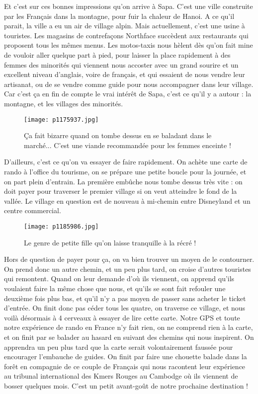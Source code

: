 \documentclass{book}
\begin{document}
Et c'est sur ces bonnes impressions qu'on arrive à Sapa. C'est une ville construite par les Français dans la montagne, pour fuir la chaleur de Hanoi. A ce qu'il parait, la ville a eu un air de village alpin. Mais actuellement, c'est une usine à touristes. Les magasins de contrefaçons Northface succèdent aux restaurants qui proposent tous les mêmes menus. Les motos-taxis nous hèlent dès qu'on fait mine de vouloir aller quelque part à pied, pour laisser la place rapidement à des femmes des minorités qui viennent nous accoster avec un grand sourire et un excellent niveau d'anglais, voire de français, et qui essaient de nous vendre leur artisanat, ou de se vendre comme guide pour nous accompagner dans leur village. Car c'est ça en fin de compte le vrai intérêt de Sapa, c'est ce qu'il y a autour : la montagne, et les villages des minorités.


\begin{figure}[h]
\centering
\texttt{[image: p1175937.jpg]}
\caption*{Ça fait bizarre quand on tombe dessus en se baladant dans le marché... C'est une viande recommandée pour les femmes enceinte !}
\end{figure}

D'ailleurs, c'est ce qu'on va essayer de faire rapidement. On achète une carte de rando à l'office du tourisme, on se prépare une petite boucle pour la journée, et on part plein d'entrain. La première embûche nous tombe dessus très vite : on doit payer pour traverser le premier village si on veut atteindre le fond de la vallée. Le village en question est de nouveau à mi-chemin entre Disneyland et un centre commercial.


\begin{wrapfigure}{l}{0.55\textwidth}
\centering
\texttt{[image: p1185986.jpg]}
\caption*{Le genre de petite fille qu'on laisse tranquille à la récré !}
\end{wrapfigure}

Hors de question de payer pour ça, on va bien trouver un moyen de le contourner. On prend donc un autre chemin, et un peu plus tard, on croise d'autres touristes qui remontent. Quand on leur demande d'où ils viennent, on apprend qu'ils voulaient faire la même chose que nous, et qu'ils se sont fait refouler une deuxième fois plus bas, et qu'il n'y a pas moyen de passer sans acheter le ticket d'entrée. On finit donc pas céder tous les quatre, on traverse ce village, et nous voilà désormais à 4 cerveaux à essayer de lire cette carte. Notre GPS et toute notre expérience de rando en France n'y fait rien, on ne comprend rien à la carte, et on finit par se balader au hasard en suivant des chemins qui nous inspirent. On apprendra un peu plus tard que la carte serait volontairement faussée pour encourager l'embauche de guides. On finit par faire une chouette balade dans la forêt en compagnie de ce couple de Français qui nous racontent leur expérience au tribunal international des Kmers Rouges au Cambodge où ils viennent de bosser quelques mois. C'est un petit avant-goût de notre prochaine destination !
\end{document}
